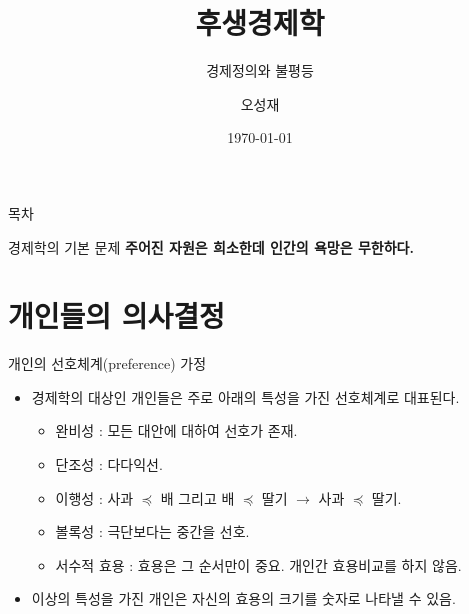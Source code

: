 \documentclass[aspectratio=169,xcolor=dvipsnames,handout]{beamer}
\title[후생경제학]{후생경제학} %
\subtitle{경제정의와 불평등}
\author[오성재]{오성재}
\institute[HNU] %
{
    한남대학교 \\
    탈메이지 교양학부 \\
}
\date{\today} %
\begin{document}
\begin{frame}
    \titlepage
\end{frame}

\begin{frame}{목차}
    \tableofcontents
\end{frame}

\begin{frame}{경제학의 기본 문제}
        \centering
        {\bf \Large 주어진 자원은 희소한데 인간의 욕망은 무한하다.}
\end{frame}

\section{개인들의 의사결정}

\begin{frame}{개인의 선호체계(preference) 가정}
    \begin{itemize}
        \item  경제학의 대상인 개인들은 주로 아래의 특성을 가진 선호체계로 대표된다.
        \begin{itemize}
            \item 완비성 : 모든 대안에 대하여 선호가 존재.
            \item 단조성 : 다다익선.
            \item 이행성 : 사과 $\preceq$ 배 그리고 배 $\preceq$ 딸기 $\rightarrow$ 사과 $\preceq$ 딸기.
            \item 볼록성 : 극단보다는 중간을 선호.
            \item 서수적 효용 : 효용은 그 순서만이 중요. 개인간 효용비교를 하지 않음. 
        \end{itemize}
        \item 이상의 특성을 가진 개인은 자신의 효용의 크기를 숫자로 나타낼 수 있음.
    \end{itemize}
\end{frame}
\end{document}
